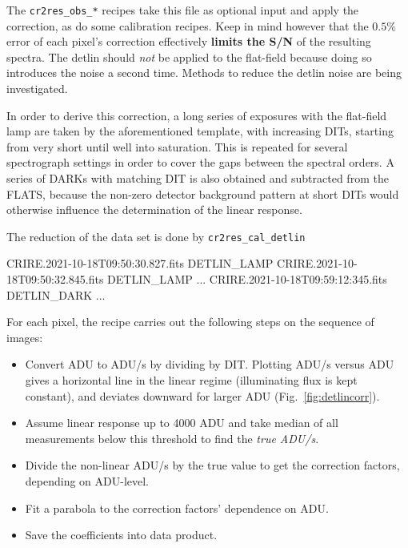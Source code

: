 The \verb!cr2res_obs_*! recipes take this file as optional input and apply the
correction, as do some calibration recipes. Keep in mind however that the
$0.5\%$ error of each pixel's correction effectively \textbf{limits the S/N} of
the resulting spectra. The detlin should \emph{not} be applied to the flat-field
because doing so introduces the noise a second time. Methods to reduce the
detlin noise are being investigated.


In order to derive this correction, a long series of exposures with the
flat-field lamp are taken by the aforementioned template, with increasing DITs,
starting from very short until well into saturation. This is repeated for
several spectrograph settings in order to cover the gaps between the spectral
orders. A series of DARKs with matching DIT is also obtained and subtracted from
the FLATS, because the non-zero detector background pattern at short DITs would
otherwise influence the determination of the linear response.

The reduction of the data set is done by \verb!cr2res_cal_detlin!
\begin{shell}[fontsize=\footnotesize]
    CRIRE.2021-10-18T09:50:30.827.fits DETLIN_LAMP
    CRIRE.2021-10-18T09:50:32.845.fits DETLIN_LAMP
    ...
    CRIRE.2021-10-18T09:59:12:345.fits DETLIN_DARK
    ...

\end{shell}

For each pixel, the recipe carries out the following steps on the sequence of images:
\begin{itemize}
    \item Convert ADU to ADU/s by dividing by DIT. Plotting ADU/s versus ADU
    gives a horizontal line in the linear regime (illuminating flux is kept
    constant), and deviates downward for larger ADU (Fig.~\ref{fig:detlincorr}).
    \item Assume linear response up to 4000 ADU and take median of all
    measurements below this threshold to find the \emph{true ADU/s}.
    \item Divide the non-linear ADU/s by the true value to get the correction
    factors, depending on ADU-level.
    \item Fit a parabola to the correction factors' dependence on ADU.
    \item Save the coefficients into data product.
\end{itemize}

